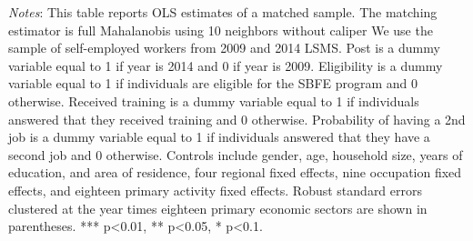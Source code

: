 \begin{table}[H]
\begin{adjustbox}{max width=\textheight}
\begin{threeparttable}
\begin{tablenotes}
				\item \textit{Notes}: This table reports OLS estimates of a matched sample. The matching estimator is full Mahalanobis using 10 neighbors without caliper We use the sample of self-employed workers from 2009 and 2014 LSMS. Post is a dummy variable equal to 1 if year is 2014 and 0 if year is 2009. Eligibility is a dummy variable equal to 1 if individuals are eligible for the SBFE program and 0 otherwise. Received training is a dummy variable equal to 1 if individuals answered that they received training and 0 otherwise. Probability of having a 2nd job is a dummy variable equal to 1 if individuals answered that they have a second job and 0 otherwise. Controls include gender, age, household size, years of education, and area of residence, four regional fixed effects, nine occupation fixed effects, and eighteen primary activity fixed effects. Robust standard errors clustered at the year times eighteen primary economic sectors are shown in parentheses. *** p<0.01, ** p<0.05, * p<0.1.
			\end{tablenotes}
		\end{threeparttable}
	\end{adjustbox}
\end{table}
